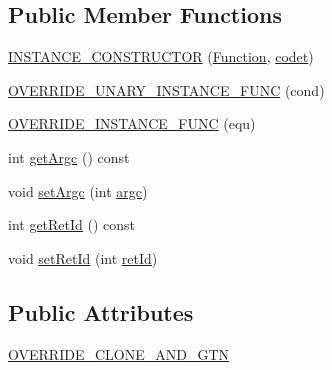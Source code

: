\subsection*{Public Member Functions}
\begin{DoxyCompactItemize}
\item 
\mbox{\hyperlink{class_erable_1_1_erable_1_1_types_1_1_function_ae1cce497e38021d34a0c1437e3d5c0ad}{I\+N\+S\+T\+A\+N\+C\+E\+\_\+\+C\+O\+N\+S\+T\+R\+U\+C\+T\+OR}} (\mbox{\hyperlink{class_erable_1_1_erable_1_1_types_1_1_function}{Function}}, \mbox{\hyperlink{class_erable_1_1_erable_1_1_types_1_1_function_a5ae77103155252fd2e6934e506644858}{codet}})
\item 
\mbox{\hyperlink{class_erable_1_1_erable_1_1_types_1_1_function_a459c1aa7350b309056776dabaa135ffe}{O\+V\+E\+R\+R\+I\+D\+E\+\_\+\+U\+N\+A\+R\+Y\+\_\+\+I\+N\+S\+T\+A\+N\+C\+E\+\_\+\+F\+U\+NC}} (cond)
\item 
\mbox{\hyperlink{class_erable_1_1_erable_1_1_types_1_1_function_afebc9e900270600dfd37e6116a312366}{O\+V\+E\+R\+R\+I\+D\+E\+\_\+\+I\+N\+S\+T\+A\+N\+C\+E\+\_\+\+F\+U\+NC}} (equ)
\item 
int \mbox{\hyperlink{class_erable_1_1_erable_1_1_types_1_1_function_a5a2a46d658aafc44e70ee17f26708cec}{get\+Argc}} () const
\item 
void \mbox{\hyperlink{class_erable_1_1_erable_1_1_types_1_1_function_aafed1327a18b38870a8f8cb263d9a980}{set\+Argc}} (int \mbox{\hyperlink{class_erable_1_1_erable_1_1_types_1_1_function_ad0c76efac6068e70316803834ebacd02}{argc}})
\item 
int \mbox{\hyperlink{class_erable_1_1_erable_1_1_types_1_1_function_aaf25d1959b693ae19dc5025e439e649b}{get\+Ret\+Id}} () const
\item 
void \mbox{\hyperlink{class_erable_1_1_erable_1_1_types_1_1_function_a1777adbe4a667ef1a16efde52d901e5d}{set\+Ret\+Id}} (int \mbox{\hyperlink{class_erable_1_1_erable_1_1_types_1_1_function_a60a53fd4e88e504fbae5ba2a8f19f996}{ret\+Id}})
\end{DoxyCompactItemize}
\subsection*{Public Attributes}
\begin{DoxyCompactItemize}
\item 
\mbox{\hyperlink{class_erable_1_1_erable_1_1_types_1_1_function_a8c738b1e68b5d74efe9b1378baf36818}{O\+V\+E\+R\+R\+I\+D\+E\+\_\+\+C\+L\+O\+N\+E\+\_\+\+A\+N\+D\+\_\+\+G\+TN}}
\end{DoxyCompactItemize}
